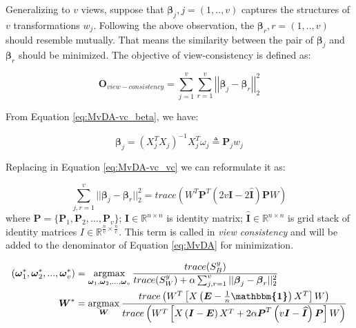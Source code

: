         Generalizing to $v$ views, suppose that ${\boldsymbol{\beta}}_j, j=(1,..,v)$ captures the structures of $v$ transformations ${w}_j$.
        Following the above observation, the $\boldsymbol{\beta}_r, r=(1,..,v)$ should resemble mutually.
        That means the similarity between the pair of $\boldsymbol{\beta}_j$ and $\boldsymbol{\beta}_r$ should be minimized.
        The objective of view-consistency is defined as:

        \begin{equation}
            \boldsymbol{O}_{view-consistency} = \sum_{j=1}^{v}\sum_{r=1}^{v}\left|\left|\boldsymbol{\beta}_j - \boldsymbol{\beta}_r\right|\right|_2^2
            \label{eq:MvDA-vc_vc}
        \end{equation}

        From Equation \eqref{eq:MvDA-vc_beta}, we have:

        \begin{equation}
            \boldsymbol{\beta}_j = {\left(X_j^T X_j\right)}^{-1}X_j^T\omega_j \triangleq \boldsymbol{P}_j w_j
        \end{equation}

        Replacing in Equation \eqref{eq:MvDA-vc_vc} we can reformulate it as:

        \begin{equation}
            \sum_{j,r=1}^{v}||\boldsymbol{\beta}_j - \boldsymbol{\beta}_r||_2^2 = trace\left(W^{T}\boldsymbol{P}^{T}\left(2v\boldsymbol{I} - 2\boldsymbol{\widehat{I}}\right)\boldsymbol{P}W\right)
        \end{equation}
        where $\boldsymbol{P} = \{\boldsymbol{P}_1,\boldsymbol{P}_2,...,\boldsymbol{P}_v\}$; $\boldsymbol{I} \in \mathbb{R}^{n\times n}$ is identity matrix; $\boldsymbol{\widehat{I}} \in \mathbb{R}^{n\times n}$ is grid stack of identity matrices $I \in \mathbb{R}^{\frac{n}{v}\times\frac{n}{v}}$.
        This term is called in \cite{kan2016multi} {\itshape view consistency} and will be added to the denominator of Equation \eqref{eq:MvDA} for minimization.

        \begin{align}
            (\boldsymbol{\omega}_1^*,\boldsymbol{\omega}_2^*, ..., \boldsymbol{\omega}_v^*) &= \operatorname*{argmax}_{\boldsymbol{\omega}_1, \boldsymbol{\omega}_2,..., \boldsymbol{\omega}_v}\frac{trace({S}_B^y)}{trace({S}_W^y) + \alpha\sum_{j,r=1}^{v}||\boldsymbol{\beta}_j - \boldsymbol{\beta}_r||_2^2}\\
            \boldsymbol{W}^* &= \operatorname*{argmax}_{\boldsymbol{W}}\frac{trace\left(W^{T}\left[X\left(\boldsymbol{E} - \frac{1}{n}\boldsymbol{\mathbbm{1}}\right)X^{T}\right]W\right)}{trace\left(W^{T}\left[X\left(\boldsymbol{I} - \boldsymbol{E}\right)X^{T} + 2\alpha\boldsymbol{P}^T\left(v\boldsymbol{I} - \boldsymbol{\widehat{I}}\right)\boldsymbol{P}\right]W\right)}
            \label{eq:MvDA-vc}
        \end{align}

